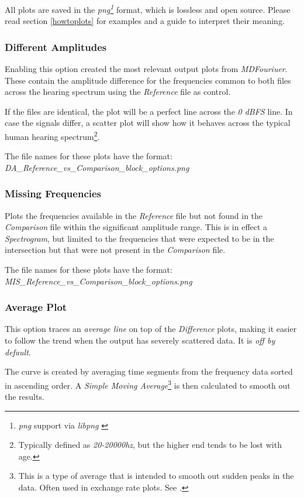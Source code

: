\documentclass[10pt,a4paper]{report}
\newcommand{\defineCite}[2] {
	\textit{\acrshort{#1}\footnote{\textit{\acrlong{#1}} #2}}}
\begin{document}
All plots are saved in the \defineCite{png}{support via \textit{libpng} \cite{libpng}} format, which is lossless and open source. Please read section \ref{howtoplots} for examples and a guide to interpret their meaning. 

\subsubsection{Different Amplitudes}

Enabling this option created the most relevant output plots from \textit{MDFouriuer}. These contain the amplitude difference for the frequencies common to both files across the hearing spectrum using the \textit{Reference} file as control.

If the files are identical, the plot will be a perfect line across the \textit{0 dBFS} line. In case the signals differ, a scatter plot will show how it behaves across the typical human hearing spectrum\footnote{Typically defined as \textit{20-20000hz}, but the higher end tends to be lost with age.}.

The file names for these plots have the format:\\ \textit{DA\_Reference\_vs\_Comparison\_block\_options.png}

\subsubsection{Missing Frequencies} 

Plots the frequencies available in the \textit{Reference} file but not found in the \textit{Comparison} file within the significant amplitude range. This is in effect a \textit{Spectrogram}, but limited to the frequencies that were expected to be in the intersection but that were not present in the \textit{Comparison} file.

The file names for these plots have the format:\\ \textit{MIS\_Reference\_vs\_Comparison\_block\_options.png}

\subsubsection{Average Plot}
\label{averaged}

This option traces an \textit{average line} on top of the \textit{Difference} plots, making it easier to follow the trend when the output has severely scattered data. It is \textit{off by default}.
 
The curve is created by averaging time segments from the frequency data sorted in ascending order. A \textit{Simple Moving Average}\footnote{This is a type of average that is intended to smooth out sudden peaks in the data. Often used in exchange rate plots. See \cite{sma}.} is then calculated to smooth out the results.
\end{document}
